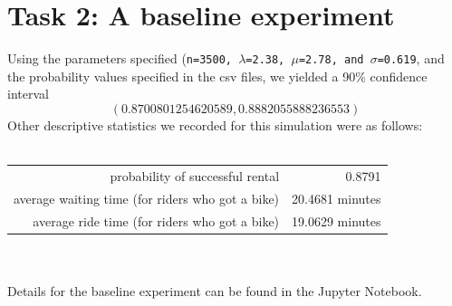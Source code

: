 \documentclass{article}
\begin{document}
\section{Task 2: A baseline experiment}
Using the parameters specified ({\tt n=3500, $\lambda$=2.38, $\mu$=2.78, and $\sigma$=0.619}, and the probability values specified in the csv files, we yielded a 90\% confidence interval $$(0.8700801254620589, 0.8882055888236553)$$ Other descriptive statistics we recorded for this simulation were as follows: \\\\
\begin{tabular}{rr}
    probability of successful rental & 0.8791 \\
    average waiting time (for riders who got a bike) & 20.4681 minutes \\
    average ride time (for riders who got a bike) & 19.0629 minutes
\end{tabular} \\\\
Details for the baseline experiment can be found in the Jupyter Notebook. 

\newpage
\end{document}
